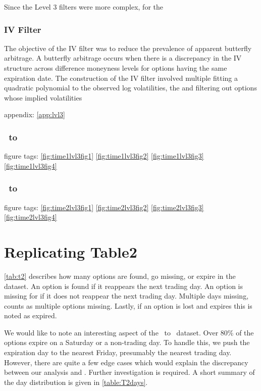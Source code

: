Since the Level 3 filters were more complex, for the 

\subsubsection{IV Filter}

The objective of the IV filter was to reduce the prevalence of apparent butterfly arbitrage. A butterfly arbitrage occurs when there is a discrepancy in the IV structure across difference moneyness levels for options having the same expiration date. The construction of the IV filter involved multiple fitting a quadratic polynomial to the observed log volatilities, the and filtering out options whose implied volatilities 


appendix: \autoref{app:lvl3}


\subsubsection{\STARTONE\ to \ENDONE }
figure tags: 
\autoref{fig:time1lvl3fig1}
\autoref{fig:time1lvl3fig2}
\autoref{fig:time1lvl3fig3}
\autoref{fig:time1lvl3fig4}
\subsubsection{\STARTTWO\ to \ENDTWO }
figure tags: 
\autoref{fig:time2lvl3fig1}
\autoref{fig:time2lvl3fig2}
\autoref{fig:time2lvl3fig3}
\autoref{fig:time2lvl3fig4}











\section{Replicating Table2}
\autoref{tab:t2} describes how many options are found, go missing, or expire in the dataset. An option is found if it reappears the next trading day. An option is missing for if it does not reappear the next trading day. Multiple days missing, counts as multiple options missing. Lastly, if an option is lost and expires this is noted as expired. 

We would like to note an interesting aspect of the \STARTONE\ to \ENDONE\ dataset. Over 80\% of the options expire on a Saturday or a non-trading day. To handle this, we push the expiration day to the nearest Friday, presumably the nearest trading day. However, there are quite a few edge cases which would explain the discrepancy between our analysis and \citet{constantinides2013}. Further investigation is required. A short summary of the day distribution is given in \autoref{table:T2days}. 

